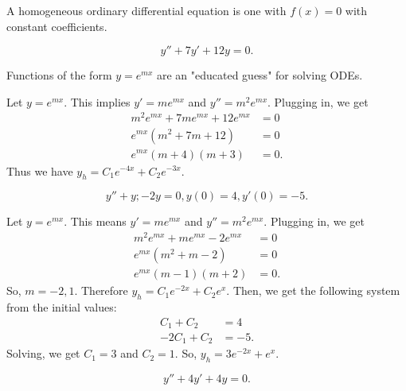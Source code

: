\begin{definition}
    A \alert{homogeneous} ordinary differential equation is one with $f(x) = 0$ 
    with constant coefficients.
\end{definition}
\begin{example}
    $$y''+7y'+12y=0.$$
\end{example}
Functions of the form $y=e^{mx}$ are an "educated guess" for solving ODEs.
\begin{soln}
    Let $y=e^{mx}$. This implies $y'=me^{mx}$ and $y'' = m^2e^{mx}$.
    Plugging in, we get
    \begin{align*}
        m^2e^{mx}+7me^{mx}+12e^{mx}&=0 \\
        e^{mx}\left(m^2+7m+12\right)&=0 \\
        e^{mx}(m+4)(m+3) &= 0.
    \end{align*}
    Thus we have $y_h = C_1e^{-4x}+C_2e^{-3x}$.
\end{soln}
\begin{example} 
    $$y''+y;-2y=0, y(0) = 4, y'(0)=-5.$$
\end{example}
\begin{soln}
    Let $y=e^{mx}$. This means $y'=me^{mx}$ and $y''=m^2e^{mx}$. Plugging in,
    we get
    \begin{align*}
        m^2e^{mx}+me^{mx}-2e^{mx} &= 0\\
        e^{mx} \left(m^2+m-2\right) &= 0 \\
        e^{mx}(m-1)(m+2) &=0.
    \end{align*}
    So, $m=-2,1$. Therefore $y_h = C_1e^{-2x} + C_2e^{x}$. Then, we get the 
    following system from the initial values:
    \begin{align*}
         C_1+C_2 &= 4 \\
         -2C_1+C_2&=-5.
    \end{align*}
    Solving, we get $C_1 = 3$ and $C_2 = 1$. So, $\boxed{y_h = 3e^{-2x}+e^{x}}$.
\end{soln}
\begin{example}
    $$y''+4y'+4y=0.$$
\end{example}
